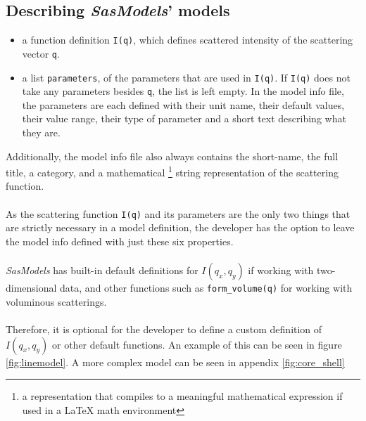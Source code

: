 \documentclass[11pt]{article}
\newcommand{\sasmodels}{\textit{SasModels}}
\begin{document}
\subsection{Describing \sasmodels' models}
\begin{itemize}
  \item a function definition \texttt{I(q)}, which defines scattered intensity 
  of the scattering vector \texttt{q}.

  \item a list \texttt{parameters}, of the parameters that are used in 
  \texttt{I(q)}. If \texttt{I(q)} does not take any parameters besides 
  \texttt{q}, the list is left empty.
  In the model info file, the parameters are each defined with their unit name, 
  their default values, their value range, their type of parameter and
  a short text describing what they are.
\end{itemize}

Additionally, the model info file also always contains the short-name, 
the full title, a category, and a mathematical \footnote{a representation 
that compiles to a meaningful mathematical expression if used in a LaTeX math 
environment} string representation of the scattering function.
\\\\
As the scattering function \texttt{I(q)} and its parameters are the only 
two things that are strictly necessary in a model definition, the developer
has the option to leave the model info defined with just these six properties.
\\\\
\sasmodels{} has built-in default definitions for $I(q_x,q_y)$ if working
with two-dimensional data, and other functions such as \texttt{form\_volume(q)}
for working with voluminous scatterings.
\\\\
Therefore, it is optional for the developer to define a custom definition
of $I(q_x, q_y)$ or other default functions.
An example of this can be seen in figure \ref{fig:linemodel}.
A more complex model can be seen in appendix \ref{fig:core_shell}
\end{document}
